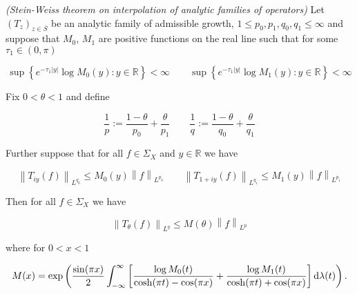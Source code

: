 \vspace{2mm}

\begin{mdframed}
	\begin{theorem}\emph{(Stein-Weiss theorem on interpolation of analytic families of operators)}
		Let $\left( T_z \right)_{z \in \overline{S}}$ be an analytic family of admissible growth, $1 \leq p_0,p_1,q_0,q_1 \leq \infty$ and suppose that $M_0$, $M_1$ are positive functions on the real line such that for some $\tau_1 \in (0,\pi)$

			\begin{equation}
				\sup\left\{e^{-\tau_1 \vert y \vert} \log M_0(y) : y \in \mathbb{R}\right\} < \infty \qquad \sup\left\{e^{-\tau_1 \vert y \vert} \log M_1(y) : y \in \mathbb{R}\right\} < \infty
			\end{equation}

			Fix $0 < \theta < 1$ and define

			\begin{equation}
				\frac{1}{p} := \frac{1 - \theta}{p_0} + \frac{\theta}{p_1} \qquad \frac{1}{q} := \frac{1 - \theta}{q_0} + \frac{\theta}{q_1}
			\end{equation}

			Further suppose that for all $f \in \Sigma_X$ and $y \in \mathbb{R}$ we have

			\begin{equation}
				\left\|T_{iy}(f)\right\|_{L^{q_0}} \leq M_0(y)\left\|f\right\|_{L^{p_0}} \qquad \left\|T_{1 + iy}(f)\right\|_{L^{q_1}} \leq M_1(y)\left\|f\right\|_{L^{p_1}} 
			\end{equation}

			Then for all $f \in \Sigma_X$ we have

			\begin{equation*}
				\left\|T_\theta(f)\right\|_{L^q} \leq M(\theta)\left\|f\right\|_{L^p}
			\end{equation*}

			\noindent where for $0 < x < 1$

			\begin{equation*}
				M(x) = \exp\left( \frac{\sin(\pi x)}{2} \int_{-\infty}^\infty \left[ \frac{\log M_0(t)}{\cosh(\pi t) - \cos(\pi x)} + \frac{\log M_1(t)}{\cosh(\pi t) + \cos(\pi x)}\right] \mathop{}\!\mathrm{d}\lambda(t) \right).
			\end{equation*}
	\end{theorem}
\end{mdframed}

\vspace{2mm}

